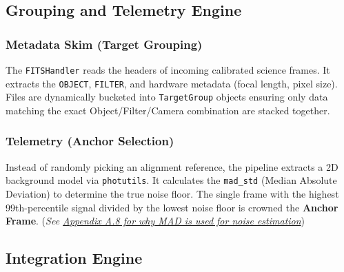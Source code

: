 \documentclass[11pt,a4paper]{article}
\begin{document}
\subsection{Grouping and Telemetry Engine}
\subsubsection{Metadata Skim (Target Grouping)}
The \texttt{FITSHandler} reads the headers of incoming calibrated science frames. It extracts the \texttt{OBJECT}, \texttt{FILTER}, and hardware metadata (focal length, pixel size). Files are dynamically bucketed into \texttt{TargetGroup} objects ensuring only data matching the exact Object/Filter/Camera combination are stacked together.

\subsubsection{Telemetry (Anchor Selection)}
Instead of randomly picking an alignment reference, the pipeline extracts a 2D background model via \texttt{photutils}. It calculates the \texttt{mad\_std} (Median Absolute Deviation) to determine the true noise floor. The single frame with the highest 99th-percentile signal divided by the lowest noise floor is crowned the \textbf{Anchor Frame}. (\textit{See \hyperref[app:mad]{Appendix A.8 for why MAD is used for noise estimation}})

\subsection{Integration Engine}
\end{document}
